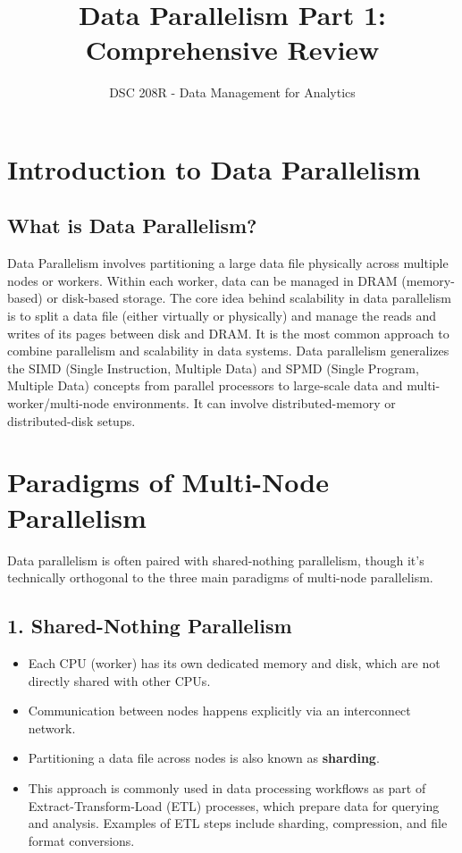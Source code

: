 \documentclass{article}
\title{Data Parallelism Part 1: Comprehensive Review}
\author{DSC 208R - Data Management for Analytics}
\date{}
\begin{document}
\maketitle

\section*{Introduction to Data Parallelism}
\subsection*{What is Data Parallelism?}
Data Parallelism involves partitioning a large data file physically across multiple nodes or workers. Within each worker, data can be managed in DRAM (memory-based) or disk-based storage.
The core idea behind scalability in data parallelism is to split a data file (either virtually or physically) and manage the reads and writes of its pages between disk and DRAM. It is the most common approach to combine parallelism and scalability in data systems. Data parallelism generalizes the SIMD (Single Instruction, Multiple Data) and SPMD (Single Program, Multiple Data) concepts from parallel processors to large-scale data and multi-worker/multi-node environments. It can involve distributed-memory or distributed-disk setups.

\section*{Paradigms of Multi-Node Parallelism}
Data parallelism is often paired with shared-nothing parallelism, though it's technically orthogonal to the three main paradigms of multi-node parallelism.

\subsection*{1. Shared-Nothing Parallelism}
\begin{itemize}
    \item Each CPU (worker) has its own dedicated memory and disk, which are not directly shared with other CPUs.
    \item Communication between nodes happens explicitly via an interconnect network.
    \item Partitioning a data file across nodes is also known as \textbf{sharding}.
    \item This approach is commonly used in data processing workflows as part of Extract-Transform-Load (ETL) processes, which prepare data for querying and analysis. Examples of ETL steps include sharding, compression, and file format conversions.
\end{itemize}
\end{document}

